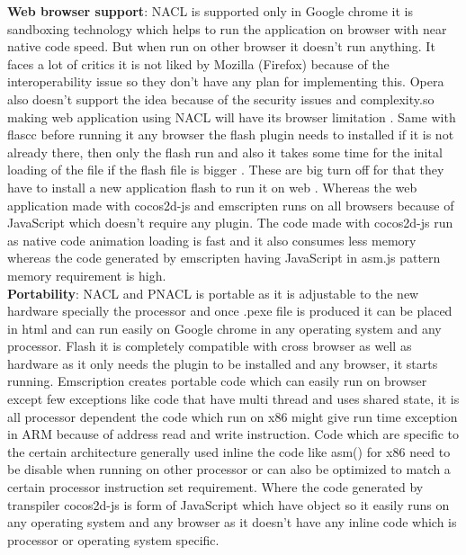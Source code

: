 \documentclass[23pt]{article}
\begin{document}
{\textbf{Web browser support}:  NACL is supported only in Google chrome  it is sandboxing technology which helps to run the application on browser with near native code speed. But when run on other browser it doesn’t run anything. It faces a lot of critics it is not liked by Mozilla (Firefox) because of the interoperability issue so they don’t have any plan for implementing this. Opera also doesn’t support the idea because of the security issues and complexity.so making web application using NACL will have its browser limitation \cite{comparenacl1}. Same with flascc before running it any browser the flash plugin needs to installed if it is not already there, then  only the flash run and also it takes some time for the inital loading of the file if the flash file is bigger . These are big turn off for that they have to install a new application flash to run it on web \cite{compareflasc2} \cite{compareflasc1}. Whereas the web application made with cocos2d-js and emscripten runs on all browsers because of JavaScript  which doesn’t require any plugin. The code made with cocos2d-js run as native code  animation loading is fast and it also consumes less memory whereas the code generated by emscripten having JavaScript in asm.js pattern  memory requirement is high.  \cite{compareasm}   \\  
\textbf{Portability}: NACL and PNACL is portable as it is adjustable to the new hardware specially the processor and once .pexe file is produced it can be placed in html and can run easily on Google chrome in any operating system and any processor. \cite{comparenacl1} Flash it is completely compatible with cross browser as well as hardware as it only needs the plugin to be installed and any browser, it starts running. Emscription creates portable code which can easily run on browser except few exceptions like code that have multi thread and uses shared state, it is all processor dependent the code which run on x86 might give run time exception in ARM because of address read and write instruction. \cite{compareemsport} Code which are specific to the certain architecture generally used inline the code like asm() for x86 need to be disable when running on other processor or can also be optimized to match a certain processor instruction set requirement. Where the code generated by transpiler cocos2d-js is form of JavaScript which have object so it easily runs on any operating system and any browser as it doesn’t have any inline code which is processor or operating system specific. \\ 
}
\end{document}
